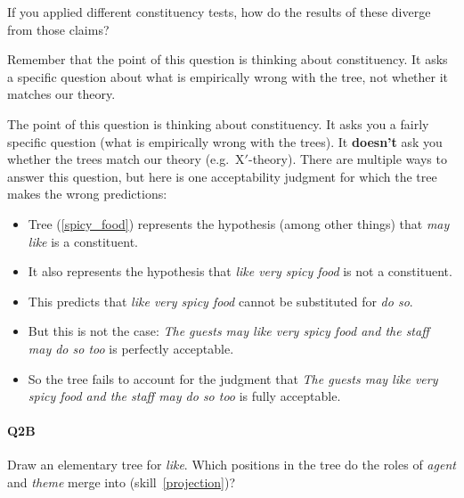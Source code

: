 \documentclass{article}
\begin{document}
If you applied different constituency tests, how do the results of these diverge from those claims?

Remember that the point of this question is thinking about constituency. It asks a specific question about what is empirically wrong with the tree, not whether it matches our theory.
\begin{exe}
    \label{spicy_food}
\end{exe}

\begin{answer}
{
The point of this question is thinking about constituency.
It asks you a fairly specific question (what is empirically wrong with the trees).
It \textbf{doesn't} ask you whether the trees match our theory (e.g.\ X$'$-theory).
There are multiple ways to answer this question, but here is one acceptability judgment for which the tree makes the wrong predictions:
\begin{itemize}
    \item Tree (\ref{spicy_food}) represents the hypothesis (among other things) that \emph{may like} is a constituent.
    \item It also represents the hypothesis that \emph{like very spicy food} is not a constituent.
    \item This predicts that \emph{like very spicy food} cannot be substituted for \emph{do so}.
    \item But this is not the case: \emph{The guests may like very spicy food and the staff may do so too} is perfectly acceptable.
    \item So the tree fails to account for the judgment that \emph{The guests may like very spicy food and the staff may do so too} is fully acceptable.
\end{itemize}
}
\end{answer}

\paragraph{Q2B} Draw an elementary tree for \emph{like}. Which positions in the tree do the roles of \emph{agent} and \emph{theme} merge into (skill~\ref{projection})? 
\end{document}
